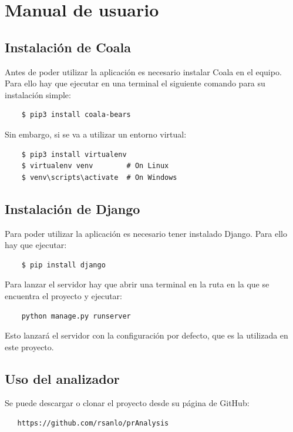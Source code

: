 \documentclass[a4paper, 12pt]{book}
\begin{document}

\cleardoublepage
\appendix
\chapter{Manual de usuario}
\label{app:manual}

\section{Instalación de Coala}
\label{app:inst_coala}
Antes de poder utilizar la aplicación es necesario instalar Coala en el equipo. Para ello hay que ejecutar en una terminal el siguiente comando para su instalación simple:
{\footnotesize
\begin{verbatim}
    $ pip3 install coala-bears
\end{verbatim}
}

Sin embargo, si se va a utilizar un entorno virtual:
{\footnotesize
\begin{verbatim}
    $ pip3 install virtualenv
    $ virtualenv venv        # On Linux
    $ venv\scripts\activate  # On Windows
\end{verbatim}
}

\section{Instalación de Django}
\label{app:inst_Django}
Para poder utilizar la aplicación es necesario tener instalado Django. Para ello hay que ejecutar:
{\footnotesize
\begin{verbatim}
    $ pip install django
\end{verbatim}
}

Para lanzar el servidor hay que abrir una terminal en la ruta en la que se encuentra el proyecto y ejecutar:
{\footnotesize
\begin{verbatim}
    python manage.py runserver
\end{verbatim}
}
Esto lanzará el servidor con la configuración por defecto, que es la utilizada en este proyecto.

\section{Uso del analizador}
\label{app:analyzer}
Se puede descargar o clonar el proyecto desde su página de GitHub:
{\footnotesize
\begin{verbatim}
   https://github.com/rsanlo/prAnalysis
\end{verbatim}
}
\end{document}
